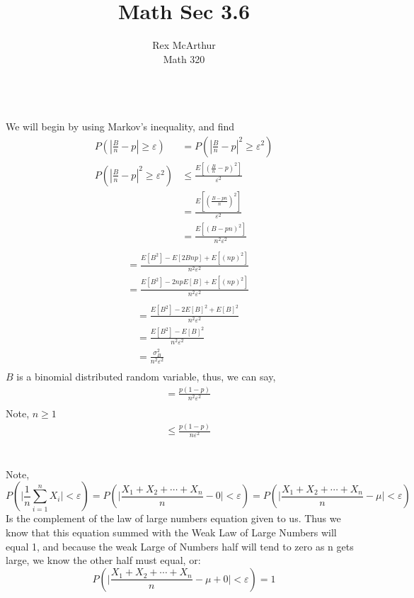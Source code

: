 \documentclass[letterpaper,12pt]{article}
\title{Math Sec 3.6}
\author{Rex McArthur\\Math 320}
\theoremstyle{definition}
\begin{document}
\maketitle

\\
We will begin by using Markov's inequality, and find
\begin{align*}
    P \left( \left| \frac{B}{n} - p \right| \geq \varepsilon \right) &= P \left( \left| \frac{B}{n} - p \right|^2 \geq \varepsilon^2 \right) \\ 
    P \left( \left| \frac{B}{n} - p \right|^2 \geq \varepsilon^2 \right) &\leq  \frac{E \left[ \left( \frac{B}{n} - p \right)^2 \right]}{\varepsilon^2} \\
    &= \frac{E \left[ \left( \frac{B-pn}{n} \right)^2 \right]}{\varepsilon^2} \\
    &= \frac{E \left[ \left( B-pn \right)^2 \right]}{n^2 \varepsilon^2} \\
\end{align*}
\begin{align*}
    &= \frac{E \left[ B^2 \right]-E\left[   2Bnp  \right] + E\left[(np)^2  \right]}{n^2 \varepsilon^2} \\
    &= \frac{E \left[ B^2 \right]-2npE\left[   B  \right] + E\left[(np)^2  \right]}{n^2 \varepsilon^2} \\
\end{align*}
\begin{align*}
    &= \frac{E \left[ B^2 \right]-2E\left[   B  \right]^2 + E\left[B  \right]^2}{n^2 \varepsilon^2} \\
    &= \frac{E \left[ B^2 \right]-E\left[   B  \right]^2 }{n^2 \varepsilon^2} \\
    &= \frac{\sigma_B^2}{n^2 \varepsilon^2} \\
\end{align*}
    $B$ is a binomial distributed random variable, thus, we can say, 
\begin{align*}
    &= \frac{p(1-p)}{n^2 \varepsilon^2} \\
\end{align*}
   Note, $n \geq 1$ 
\begin{align*}
    &\leq \frac{p(1-p)}{n \varepsilon^2} \\
\end{align*}

\\

Note,
\[P \left( \Big| \frac{1}{n} \sum^{n}_{i=1} X_i \Big| < \varepsilon \right) = 
P \left( \Big| \frac{X_1 + X_2 +\cdots+ X_n}{n} - 0 \Big| < \varepsilon\right) = 
P \left( \Big| \frac{X_1 + X_2 +\cdots+ X_n}{n} - \mu \Big| < \varepsilon\right)\]
Is the complement of the law of large numbers equation given to us. Thus we know that this equation summed with the Weak Law of Large Numbers will equal 1, and because the weak Large of Numbers half will tend to zero as n gets large, we know the other half must equal, or:
\[P \left( \Big| \frac{X_1 + X_2 +\cdots+ X_n}{n} - \mu + 0 \Big| < \varepsilon\right) = 1\]
\end{document}
